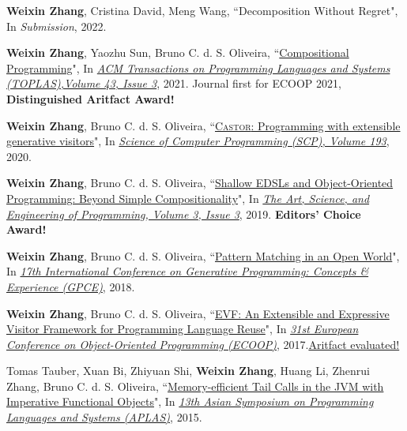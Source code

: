 \documentclass[paper=letter,fontsize=11pt]{scrartcl} %
\newcommand{\PaperEntry}[4]{
		\noindent #1, ``{#2}", In \textit{#3}, #4.} %
\begin{document}
\begin{etaremune}

\item \PaperEntry{\textbf{Weixin Zhang}, Cristina David, Meng Wang}{Decomposition Without Regret}{Submission}{2022}

\item \PaperEntry{\textbf{Weixin Zhang}, Yaozhu Sun, Bruno C. d. S.
    Oliveira}{\href{https://wxzh.github.io/papers/toplas2021.pdf}{Compositional Programming}}{\href{https://dx.doi.org/10.1145/3460228}{ACM Transactions on Programming Languages and Systems (TOPLAS),Volume 43, Issue 3}}{2021}{ Journal first for ECOOP 2021, \textbf{Distinguished Aritfact Award!}}

\item \PaperEntry{\textbf{Weixin Zhang}, Bruno C. d. S.
    Oliveira}{\href{https://wxzh.github.io/papers/scp2020.pdf}{\textsc{Castor}: Programming with extensible generative
    visitors}}{\href{https://doi.org/10.1016/j.scico.2020.102449}{Science of Computer Programming (SCP), Volume 193}}{2020} 

\item \PaperEntry{\textbf{Weixin Zhang}, Bruno C. d. S. Oliveira}{\href{https://wxzh.github.io/papers/programming19.pdf}{Shallow EDSLs
    and Object-Oriented Programming: Beyond Simple Compositionality}}{\href{https://programming-journal.org/2019/3/10/}{The Art,
    Science, and Engineering of Programming, Volume 3, Issue 3}}{2019}{ \textbf{Editors' Choice Award!}}

\item \PaperEntry{\textbf{Weixin Zhang}, Bruno C. d. S. Oliveira}{\href{https://wxzh.github.io/papers/gpce2018.pdf}{Pattern
    Matching in an Open World}}{\href{https://dl.acm.org/doi/10.1145/3278122.3278124}{17th International Conference on Generative Programming: Concepts \& Experience (GPCE)}}{2018}

\item \PaperEntry{\textbf{Weixin Zhang}, Bruno C. d. S. Oliveira}{\href{https://wxzh.github.io/papers/ecoop2017.pdf}{EVF: An Extensible and
    Expressive Visitor Framework for Programming Language Reuse}}{\href{https://2017.ecoop.org/track/ecoop-2017-papers}{31st European Conference on Object-Oriented Programming (ECOOP)}}{2017}{\href{https://2017.ecoop.org/track/ecoop-2017-Artifacts#accepted-artifacts}{Aritfact evaluated!}}

\item \PaperEntry{Tomas Tauber, Xuan Bi, Zhiyuan Shi, \textbf{Weixin Zhang}, Huang Li, Zhenrui Zhang, Bruno C. d. S. Oliveira}{\href{https://wxzh.github.io/papers/aplas2015.pdf}{Memory-efficient Tail Calls in the JVM with Imperative Functional Objects}}
{\href{https://link.springer.com/chapter/10.1007\%2F978-3-319-26529-2_2}{13th Asian Symposium on Programming Languages and Systems (APLAS)}}{2015}
\end{etaremune}
\end{document}
